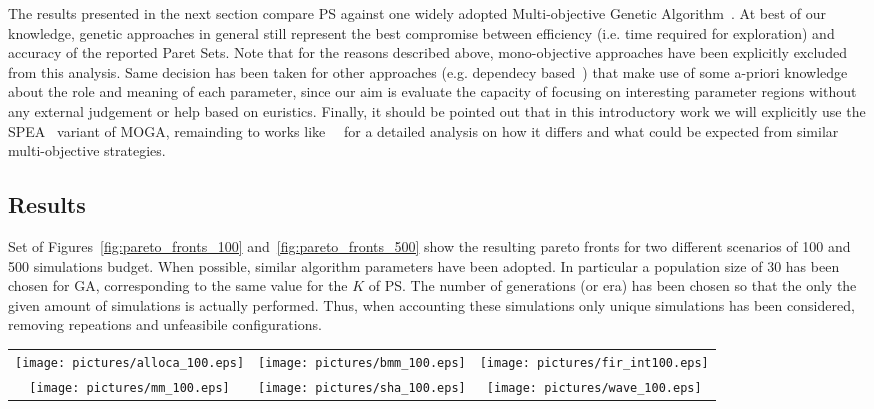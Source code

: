 The results presented in the next section compare PS against one
widely adopted Multi-objective Genetic
Algorithm~\cite{knowles_techrep06}. At best of our knowledge, genetic
approaches in general still represent the best compromise between
efficiency (i.e. time required for exploration) and accuracy of the
reported Paret Sets.  Note that for the reasons described above,
mono-objective approaches have been explicitly excluded from this
analysis. Same decision has been taken for other approaches (e.g.
dependecy based~\cite{givargis_tvlsi02}) that make use of some
a-priori knowledge about the role and meaning of each parameter, since
our aim is evaluate the capacity of focusing on interesting parameter
regions without any external judgement or help based on euristics.
Finally, it should be pointed out that in this introductory work we
will explicitly use the SPEA~\cite{zitzler_eurogen01} variant of MOGA,
remainding to works like~\cite{zitzler_ec00}~\cite{zitzler_tec03} for
a detailed analysis on how it differs and what could be expected from
similar multi-objective strategies.


\subsection{Results}

Set of Figures~\ref{fig:pareto_fronts_100}
and~\ref{fig:pareto_fronts_500} show the resulting pareto fronts for two
different scenarios of 100 and 500 simulations budget. When possible,
similar algorithm parameters have been adopted. In particular a
population size of 30 has been chosen for GA, corresponding to the
same value for the $K$ of PS. The number of generations (or era)
has been chosen so that the only the given amount of simulations is
actually performed. Thus, when accounting these simulations only unique simulations
has been considered, removing repeations and unfeasibile
configurations.

\begin{table*}
  \centering
  \begin{tabular}{ccc}
    \texttt{[image: pictures/alloca\_100.eps]} &
    \texttt{[image: pictures/bmm\_100.eps]} & 
    \texttt{[image: pictures/fir\_int100.eps]} \\
    \texttt{[image: pictures/mm\_100.eps]} &
    \texttt{[image: pictures/sha\_100.eps]} &
    \texttt{[image: pictures/wave\_100.eps]} 
  \end{tabular}
  \caption{Pareto fronts found by PS and GA for a fixed budget of 100 configurations.}
  \label{fig:pareto_fronts_100}
\end{table*}

